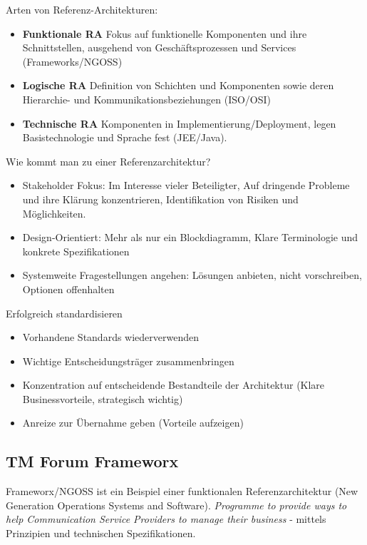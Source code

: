 Arten von Referenz-Architekturen:
\begin{itemize}
	\item \textbf{Funktionale RA} Fokus auf funktionelle Komponenten und ihre Schnittstellen, ausgehend von Geschäftsprozessen und Services (Frameworks/NGOSS)
	\item \textbf{Logische RA} Definition von Schichten und Komponenten sowie deren Hierarchie- und Kommunikationsbeziehungen (ISO/OSI)
	\item \textbf{Technische RA} Komponenten in Implementierung/Deployment, legen Basistechnologie und Sprache fest (JEE/Java).
\end{itemize}

\newpage

Wie kommt man zu einer Referenzarchitektur?
\begin{itemize}
	\item Stakeholder Fokus: Im Interesse vieler Beteiligter, Auf dringende Probleme und ihre Klärung konzentrieren, Identifikation von Risiken und Möglichkeiten.
	
	\item Design-Orientiert: Mehr als nur ein Blockdiagramm, Klare Terminologie und konkrete Spezifikationen
	
	\item Systemweite Fragestellungen angehen: Lösungen anbieten, nicht vorschreiben, Optionen offenhalten
\end{itemize}

Erfolgreich standardisieren
\begin{itemize}
	\item Vorhandene Standards wiederverwenden
	\item Wichtige Entscheidungsträger zusammenbringen
	\item Konzentration auf entscheidende Bestandteile der Architektur (Klare Businessvorteile, strategisch wichtig)
	\item Anreize zur Übernahme geben (Vorteile aufzeigen)
\end{itemize}

\subsection{TM Forum Frameworx}

Frameworx/NGOSS ist ein Beispiel einer funktionalen Referenzarchitektur (New Generation Operations Systems and Software). \textit{Programme to provide ways to help Communication Service Providers to manage their business} - mittels Prinzipien und technischen Spezifikationen.

